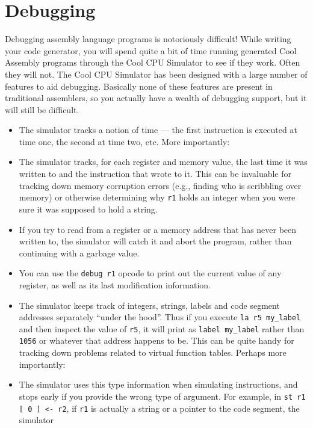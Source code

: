 \documentclass[]{article}
\begin{document}
\section{Debugging}

Debugging assembly language programs is notoriously difficult! While
writing your code generator, you will spend quite a bit of time running
generated Cool Assembly programs through the Cool CPU Simulator to see
if they work. Often they will not. The Cool CPU Simulator has been
designed with a large number of features to aid debugging. Basically
none of these features are present in traditional assemblers, so you
actually have a wealth of debugging support, but it will still be
difficult.

\begin{itemize}
\itemsep1pt\parskip0pt
\item
  The simulator tracks a notion of time --- the first instruction is
  executed at time one, the second at time two, etc. More importantly:
\item
  The simulator tracks, for each register and memory value, the last
  time it was written to and the instruction that wrote to it. This can
  be invaluable for tracking down memory corruption errors (e.g.,
  finding who is scribbling over memory) or otherwise determining why
  \texttt{r1} holds an integer when you were sure it was supposed to
  hold a string.
\item
  If you try to read from a register or a memory address that has never
  been written to, the simulator will catch it and abort the program,
  rather than continuing with a garbage value.
\item
  You can use the \texttt{debug r1} opcode to print out the current
  value of any register, as well as its last modification information.
\item
  The simulator keeps track of integers, strings, labels and code
  segment addresses separately ``under the hood''. Thus if you execute
  \texttt{la r5 my\_label} and then inspect the value of \texttt{r5}, it
  will print as \texttt{label my\_label} rather than \texttt{1056} or
  whatever that address happens to be. This can be quite handy for
  tracking down problems related to virtual function tables. Perhaps
  more importantly:
\item
  The simulator uses this type information when simulating instructions,
  and stops early if you provide the wrong type of argument. For
  example, in \texttt{st r1 {[} 0 {]} \textless{}- r2}, if \texttt{r1}
  is actually a string or a pointer to the code segment, the simulator

\end{itemize}
\end{document}
